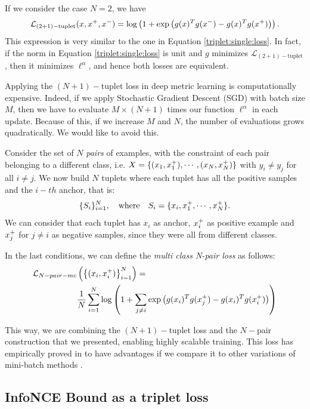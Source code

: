 \begin{remark}
If we consider the case $N=2$, we have
\[
\mathcal L_{(2+1)-\text{tuplet}}(x,x^+,x^-) = \log \left( 1+ \exp \left(g(x)^Tg(x^-) - g(x)^T g(x^+)\right)\right).
\]
This expression is very similar to the one in Equation \eqref{triplet:single:loss}. In fact, if the norm in Equation \eqref{triplet:single:loss} is unit and $g$ minimizes $\mathcal L_{(2+1)-\text{tuplet}}$, then it minimizes $\ell^\alpha$, and hence both losses are equivalent.
\end{remark}



Applying the $(N+1)-$tuplet loss in deep metric learning is computationally expensive. Indeed, if we apply Stochastic Gradient Descent (SGD) with batch size $M$, then we have to evaluate $M \times (N+1)$ times our function $\ell^\alpha$ in each update. Because of this, if we increase $M$ and $N$, the number of evaluations grows quadratically. We would like to avoid this.

Consider the set of $N$ \emph{pairs} of examples, with the constraint of each pair belonging to a different class, i.e. $X = \{(x_1,x^+_1),\cdots,(x_N,x^+_N)\}$ with $y_i \neq y_j$ for all $i \neq j$. We now build $N$ tuplets where each tuplet has all the positive samples and the $i-th$ anchor, that is:
\[
\{S_i\}_{i=1}^N, \quad \text{where} \quad S_i = \{x_i, x^+_1,\cdots,x^+_N\}.  
\]
We can consider that each tuplet has $x_i$ as anchor, $x^+_i$ as positive example and $x^+_j$ for $j \neq i$ as negative samples, since they were all from different classes.

\begin{ndef}
In the last conditions, we can define the \emph{multi class N-pair loss} as follows:
\begin{align}
\mathcal L_{N-pair-mc} & \left(\left\{(x_i,x^+_i)\right\}_{i=1}^N \right)  = \nonumber \\
& \frac{1}{N} \sum_{i=1}^N \log \left(1+ \sum_{j\neq i} \exp\left(g(x_i)^T g(x^+_j) - g(x_i)^Tg(x^+_i)\right)\right) \label{N:Pair:loss}
\end{align}
\end{ndef}
This way, we are combining the $(N+1)-$tuplet loss and the $N-$pair construction that we presented, enabling highly scalable training. This loss has empirically proved in to have advantages if we compare it to other variations of mini-batch methods \citep{Sohn2016ImprovedDM}.

\subsection{InfoNCE Bound as a triplet loss}

